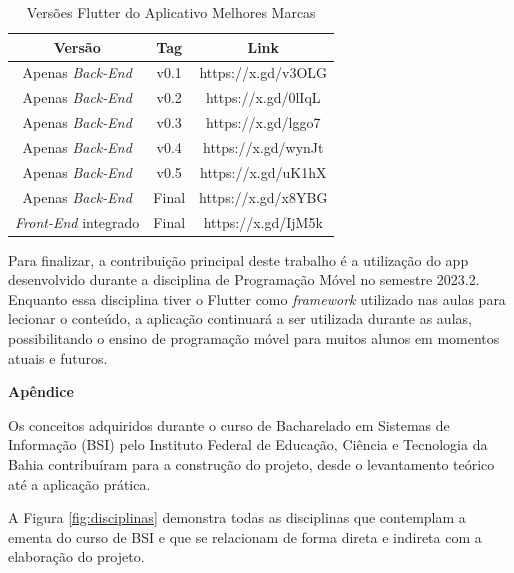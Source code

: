 \documentclass[12pt]{article}
\begin{document}
\begin{table}[ht!]
    \centering
    \begin{tabular}{|c|c|c|}\hline
         Versão & Tag & Link \\\hline
         Apenas \textit{Back-End} & v0.1 & https://x.gd/v3OLG \\\hline
         Apenas \textit{Back-End} & v0.2 & https://x.gd/0lIqL \\\hline
         Apenas \textit{Back-End} & v0.3 & https://x.gd/lggo7 \\\hline
         Apenas \textit{Back-End} & v0.4 & https://x.gd/wynJt \\\hline
         Apenas \textit{Back-End} & v0.5 & https://x.gd/uK1hX \\\hline
         Apenas \textit{Back-End} & Final & https://x.gd/x8YBG \\\hline
         \textit{Front-End} integrado & Final & https://x.gd/IjM5k \\\hline
    \end{tabular}
    \caption{Versões Flutter do Aplicativo Melhores Marcas}
    \label{tab:versoes}
\end{table}

Para finalizar, a contribuição principal deste trabalho é a utilização do app desenvolvido durante a disciplina de Programação Móvel no semestre 2023.2. Enquanto essa disciplina tiver o Flutter como  \textit{framework} utilizado nas aulas para lecionar o conteúdo, a aplicação continuará a ser utilizada durante as aulas, possibilitando o ensino de programação móvel para muitos alunos em momentos atuais e futuros.




\newpage

\noindent\textbf{Apêndice}

Os conceitos adquiridos durante o curso de Bacharelado em Sistemas de Informação (BSI) pelo Instituto Federal de Educação, Ciência e Tecnologia da Bahia contribuíram para a construção do projeto, desde o levantamento teórico até a aplicação prática.

A Figura \ref{fig:disciplinas} demonstra todas as disciplinas que contemplam a ementa do curso de BSI e que se relacionam de forma direta e indireta com a elaboração do projeto.
\end{document}
